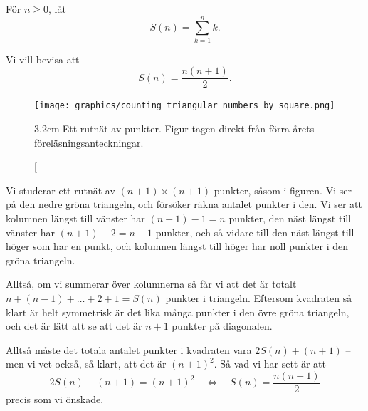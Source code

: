 \documentclass{tufte-handout}
\begin{document}
\begin{example}\label{example_triangular_numbers}
  För $n\geq 0$, låt
  $$S(n) = \sum_{k=1}^n k.$$
  
  Vi vill bevisa att
  $$S(n) = \frac{n(n+1)}{2}.$$

  \begin{figure}
    \texttt{[image: graphics/counting\_triangular\_numbers\_by\_square.png]}
    \caption[][3.2cm]{Ett rutnät av punkter. Figur tagen direkt från förra årets föreläsningsanteckningar.}
  \end{figure}
  
  Vi studerar ett rutnät av $(n+1)\times(n+1)$ punkter, såsom i figuren. Vi ser på den nedre gröna triangeln, och försöker räkna antalet punkter i den. Vi ser att kolumnen längst till vänster har $(n+1)-1 = n$ punkter, den näst längst till vänster har $(n+1)-2=n-1$ punkter, och så vidare till den näst längst till höger som har en punkt, och kolumnen längst till höger har noll punkter i den gröna triangeln.

  Alltså, om vi summerar över kolumnerna så får vi att det är totalt $n + (n-1) + \ldots + 2 + 1 = S(n)$ punkter i triangeln. Eftersom kvadraten så klart är helt symmetrisk är det lika många punkter i den övre gröna triangeln, och det är lätt att se att det är $n+1$ punkter på diagonalen.

  Alltså måste det totala antalet punkter i kvadraten vara $2S(n) + (n+1)$ -- men vi vet också, så klart, att det är $(n+1)^2$. Så vad vi har sett är att
  $$2S(n) + (n + 1) = (n + 1)^2 \quad\Longleftrightarrow\quad S(n) = \frac{n(n+1)}{2}$$
  precis som vi önskade.
\end{example}
\end{document}

